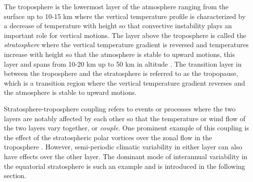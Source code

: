 The troposphere is the lowermost layer of the atmosphere ranging from the surface up to 10-15 km where the vertical temperature profile is characterized by a decrease of temperature with height so that convective instability plays an important role for vertical motions.
The layer above the troposphere is called the \textit{stratosphere} where the vertical temperature gradient is reversed and temperatures increase with height so that the atmosphere is stable to upward motions, this layer and spans from 10-20 km up to 50 km in altitude \citep{andrews1987}. 
The transition layer in between the troposphere and the stratosphere is referred to as the tropopause, which is a transition region where the vertical temperature gradient reverses and the atmosphere is stable to upward motions. 


Stratosphere-troposphere coupling refers to events or processes where the two layers are notably affected by each other so that the temperature or wind flow of the two layers vary together, or \textit{couple}. One prominent example of this coupling is the effect of the stratospheric polar vortices over the zonal flow in the troposphere \citep{thompson2005,domeisen2019}. 
However, semi-periodic climatic variability in either layer can also have effects over the other layer. The dominant mode of interannual variability in the equatorial stratosphere is such an example and is introduced in the following section. 

